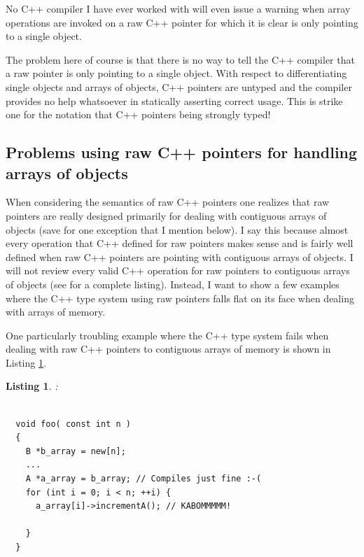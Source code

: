 \documentclass[pdf,ps2pdf,11pt]{SANDreport}
\newtheorem{listing}{Listing}
\begin{document}
No C++ compiler I have ever worked with will even issue a warning when
array operations are invoked on a raw C++ pointer for which it is
clear is only pointing to a single object.

The problem here of course is that there is no way to tell the C++
compiler that a raw pointer is only pointing to a single object.  With
respect to differentiating single objects and arrays of objects, C++
pointers are untyped and the compiler provides no help whatsoever in
statically asserting correct usage.  This is strike one for the
notation that C++ pointers being strongly typed!


%
{}\subsection{Problems using raw C++ pointers for handling arrays of
objects}
\label{sec:problem-with-raw-array-pointers}
%

When considering the semantics of raw C++ pointers one realizes that
raw pointers are really designed primarily for dealing with contiguous
arrays of objects (save for one exception that I mention below).  I
say this because almost every operation that C++ defined for raw
pointers makes sense and is fairly well defined when raw C++ pointers
are pointing with contiguous arrays of objects.  I will not review
every valid C++ operation for raw pointers to contiguous arrays of
objects (see {}\cite{stroustrup97} for a complete listing).  Instead,
I want to show a few examples where the C++ type system using raw
pointers falls flat on its face when dealing with arrays of memory.

One particularly troubling example where the C++ type system fails
when dealing with raw C++ pointers to contiguous arrays of memory is
shown in Listing {}\ref{listing:BadArrayPointerConversion}.

\begin{listing}:\\
\label{listing:BadArrayPointerConversion}
{\small\begin{verbatim}

  void foo( const int n )
  {
    B *b_array = new[n];
    ...
    A *a_array = b_array; // Compiles just fine :-(
    for (int i = 0; i < n; ++i) {
      a_array[i]->incrementA(); // KABOMMMMM!

    }
  }

\end{verbatim}}
\end{listing}
\end{document}
